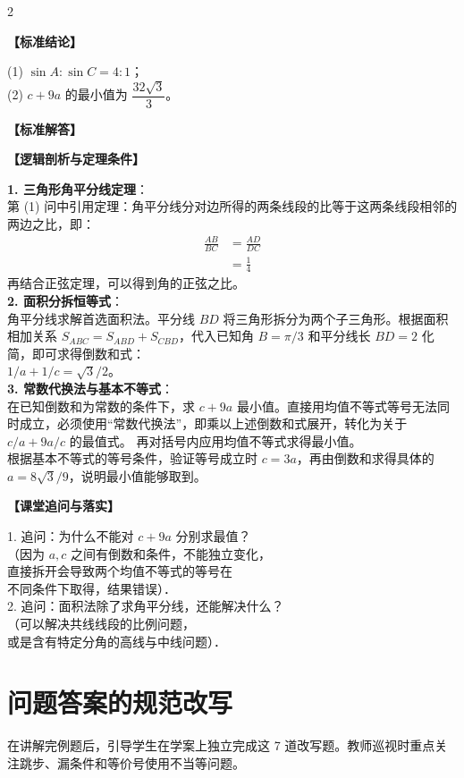 \documentclass[11pt,a4paper]{ctexart}
\newcommand{\teachblock}[2]{%
  \par\addvspace{0.55em}%
  \noindent\textbf{【#1】}\par\nobreak
  \begingroup
    \raggedright
    \setlength{\parskip}{0.35em}%
    #2\par
  \endgroup
}
\begin{document}
\begin{paracol}{2}
\teachblock{标准结论}{
  (1) $\sin A : \sin C = 4:1$；\\
  (2) $c + 9a$ 的最小值为 $\dfrac{32\sqrt{3}}{3}$。
}
\teachblock{标准解答}{
  \qTriangleBisectorMinSolution
}

\switchcolumn
\teachblock{逻辑剖析与定理条件}{
  \textbf{1. 三角形角平分线定理}：\\
  第 (1) 问中引用定理：角平分线分对边所得的两条线段的比等于这两条线段相邻的两边之比，即：
  \[
  \begin{aligned}
    \frac{AB}{BC} &= \frac{AD}{DC} \\
    &= \frac{1}{4}
  \end{aligned}
  \]
  再结合正弦定理，可以得到角的正弦之比。\\
  \textbf{2. 面积分拆恒等式}：\\
  角平分线求解首选面积法。平分线 $BD$ 将三角形拆分为两个子三角形。根据面积相加关系 $S_{ABC} = S_{ABD} + S_{CBD}$，代入已知角 $B = \pi/3$ 和平分线长 $BD = 2$ 化简，即可求得倒数和式：\\$1/a + 1/c = \sqrt{3}/2$。\\
  \textbf{3. 常数代换法与基本不等式}：\\
  在已知倒数和为常数的条件下，求 $c+9a$ 最小值。直接用均值不等式等号无法同时成立，必须使用“常数代换法”，即乘以上述倒数和式展开，转化为关于 $c/a + 9a/c$ 的最值式。
  再对括号内应用均值不等式求得最小值。\\
  根据基本不等式的等号条件，验证等号成立时 $c=3a$，再由倒数和求得具体的 $a = 8\sqrt{3}/9$，说明最小值能够取到。
}
\teachblock{课堂追问与落实}{
  1. 追问：为什么不能对 $c+9a$ 分别求最值？\\
  （因为 $a, c$ 之间有倒数和条件，不能独立变化，\\
  直接拆开会导致两个均值不等式的等号在\\
  不同条件下取得，结果错误）．\\
  2. 追问：面积法除了求角平分线，还能解决什么？\\
  （可以解决共线线段的比例问题，\\
  或是含有特定分角的高线与中线问题）．
}
\end{paracol}

\newpage

\section{问题答案的规范改写}

在讲解完例题后，引导学生在学案上独立完成这 7 道改写题。教师巡视时重点关注跳步、漏条件和等价号使用不当等问题。
\end{document}
